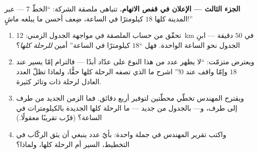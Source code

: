 \begin{problem}
\medskip\noindent\textbf{الجزء الثالث --- الإعلان في قفص
الاتهام.}
تتباهى ملصقة الشركة: ``الخطّ 7 --- عبر المدينة كلها  $18$
كيلومترًا في الساعة، ضِعف أحسن ما يبلغه ماشٍ!''
\begin{enumerate}[resume]
  \item تحقّق من حساب الملصقة في مواجهة الجدول الزمني:
        \qty{12}{km} في $50$ دقيقة --- ابنِ الجدول نحو الساعة
        الواحدة. فهل ``$18$ كيلومترًا في الساعة'' أمين
        \emph{للرحلة كلها}؟
  \item ويعترض متزمّت: ``لا يظهر عدد من هذا النوع على عدّاد
         أبدًا --- فالترام إمّا يسير عند $18$ وإمّا واقف
        عند $0$!'' اشرح ما الذي تصفه  الرحلة كلها حقًّا،
        ولماذا تظلّ العدد العادل لرحلة ذات وتائر كثيرة.
  \item ويقترح المهندس تخطّي محطّتين لتوفير أربع دقائق. فما
        الزمن الجديد من طرف إلى طرف، و--- بالجدول من جديد ---
        ما  الرحلة كلها الجديدة بالكيلومترات في الساعة؟
        (قرِّب تقريبًا معقولًا.)
  \item واكتب تقرير المهندس في جملة واحدة: بأيّ عدد ينبغي أن
        يثق الركّاب في التخطيط،  السير أم  الرحلة كلها،
        ولماذا؟
\end{enumerate}
\end{problem}
